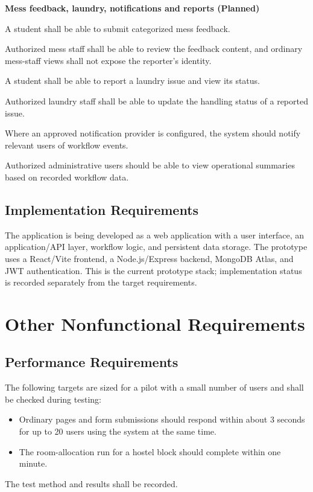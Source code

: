 \documentclass[11pt,a4paper]{article}
\numberwithin{figure}{section}   %
\begin{document}
\textbf{Mess feedback, laundry, notifications and reports (Planned)}
\begin{description}[style=sameline,leftmargin=3.0cm,labelwidth=2.8cm,labelsep=0.2cm,font=\bfseries\small,itemsep=3pt]
\item[FR-MESS-01] A student shall be able to submit categorized mess feedback.
\item[FR-MESS-02] Authorized mess staff shall be able to review the feedback content, and ordinary mess-staff views shall not expose the reporter's identity.
\item[FR-LDRY-01] A student shall be able to report a laundry issue and view its status.
\item[FR-LDRY-02] Authorized laundry staff shall be able to update the handling status of a reported issue.
\item[FR-NTF-01] Where an approved notification provider is configured, the system should notify relevant users of workflow events.
\item[FR-RPT-01] Authorized administrative users should be able to view operational summaries based on recorded workflow data.
\end{description}

\subsection{Implementation Requirements}\label{sec:impl}
The application is being developed as a web application with a user interface, an application/API layer, workflow logic, and persistent data storage. The prototype uses a React/Vite frontend, a Node.js/Express backend, MongoDB Atlas, and JWT authentication. This is the current prototype stack; implementation status is recorded separately from the target requirements.

\section{Other Nonfunctional Requirements}
\subsection{Performance Requirements}
The following targets are sized for a pilot with a small number of users and shall be checked during testing:
\begin{itemize}
\item Ordinary pages and form submissions should respond within about 3 seconds for up to 20 users using the system at the same time.
\item The room-allocation run for a hostel block should complete within one minute.
\end{itemize}
The test method and results shall be recorded.
\end{document}
